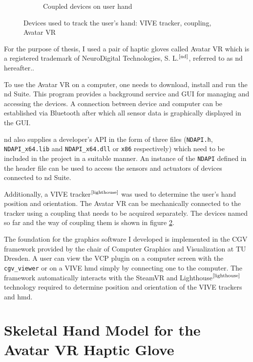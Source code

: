 \documentclass[hyperref, bachelorofscience]{cgvpub}
\newcommand{\newcite}[1]{$ ^{\text{\cite{#1}}} $}
\begin{document}
\begin{figure}[b!]
\begin{subfigure}{.49\linewidth}
		\caption{Coupled devices on user hand}
		\label{fig:devices:cou}
	\end{subfigure}
	\caption[Devices used to track the user's hand]{Devices used to track the user's hand: \Gls{VIVE} tracker, coupling, Avatar VR}
	\label{fig:devices}
\end{figure}

For the purpose of thesis, I used a pair of haptic gloves called Avatar VR which is a registered trademark of NeuroDigital Technologies, S. L.\newcite{nd}, referred to as \acrshort{nd} hereafter..

To use the Avatar VR on a computer, one needs to download, install and run the \acrshort{nd} Suite. This program provides a background service and GUI for managing and accessing the devices. A connection between device and computer can be established via Bluetooth after which all sensor data is graphically displayed in the GUI.

\acrshort{nd} also supplies a developer's API in the form of three files (\lstinline|NDAPI.h|, \lstinline|NDAPI_x64.lib| and \lstinline|NDAPI_x64.dll| or \lstinline|x86| respectively) which need to be included in the project in a suitable manner. An instance of the \lstinline|NDAPI| defined in the header file can be used to access the sensors and actuators of devices connected to \acrshort{nd} Suite.

Additionally, a \Gls{VIVE} tracker\newcite{lighthouse} was used to determine the user's hand position and orientation. The Avatar VR can be mechanically connected to the tracker using a coupling that needs to be acquired separately. The devices named so far and the way of coupling them is shown in figure \ref{fig:devices}.

The foundation for the graphics software I developed is implemented in the \gls{CGV} framework provided by the chair of Computer Graphics and Visualization at TU Dresden. A user can view the \gls{VCP} plugin on a computer screen with the \lstinline|cgv_viewer| or on a \Gls{VIVE} \acrfull{hmd} simply by connecting one to the computer. The framework automatically interacts with the SteamVR and Lighthouse\newcite{lighthouse} technology required to determine position and orientation of the \Gls{VIVE} trackers and \acrshort{hmd}.

\section{Skeletal Hand Model for the Avatar VR Haptic Glove} \label{sec:hand_model}
\end{document}
